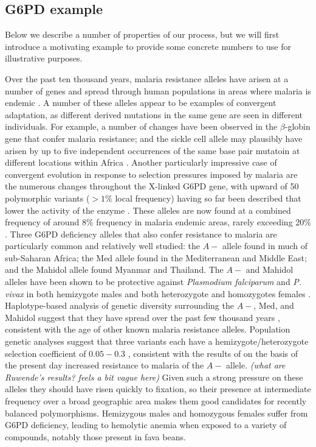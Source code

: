 \documentclass{article}
\newcommand{\plr}[1]{{\it\color{blue}(#1)}}
\begin{document}
\subsection{G6PD example}

Below we describe a number of properties of our process, but we will first introduce 
a motivating example to provide some concrete
numbers to use for illustrative purposes.

Over the past ten thousand years, malaria resistance alleles have arisen at a number of genes 
and spread through human populations in areas where malaria is endemic \citep{Kwiatkowski:05}. 
A number of these alleles appear to be examples of convergent adaptation, 
as different derived mutations in the same gene are seen in different individuals.
For example, 
a number of changes have been observed in the $\beta$-globin gene that confer malaria resistance;
and the sickle cell allele may plausibly have arisen by up to five independent occurrences
of the same base pair mutatoin at different locations within Africa
\citep{Flint:98,ralph2010parallel}.
Another particularly impressive case of convergent evolution in response to
selection pressures imposed by malaria are the numerous changes throughout the X-linked G6PD gene, 
with upward of 50 polymorphic variants ($>1\%$ local frequency) having so far been described 
that lower the activity of the enzyme \citep{Howes-g6pd-variants,Minucci-g6pd}. 
These alleles are now found at a combined frequency of around 8\% frequency in malaria endemic areas,
rarely exceeding 20\% \citep{Howes-g6pd-preval}. 
Three G6PD deficiency alleles that also confer resistance to malaria 
are particularly common and relatively well studied: 
the $A-$ allele found in much of sub-Saharan Africa; 
the Med allele found in the Mediterranean and Middle East; 
and the Mahidol allele found Myanmar and Thailand.
The $A-$ and Mahidol alleles have been shown
to be protective against {\it Plasmodium falciparum} and {\it P. vivax} in both
hemizygote males and both heterozygote and homozygotes females \citep{Ruwende-g6pd, Louicharoen-g6pd}. 
Haplotype-based analysis of genetic diversity surrounding
the $A-$, Med, and Mahidol suggest that they have spread over the past 
few thousand years \citet{tishkoff-g6pd,Slatkin-age-est,Saunders-g6pd,Louicharoen-g6pd}, 
consistent with the age of other known malaria resistance alleles. 
Population genetic analyses suggest that three variants each have a hemizygote/heterozygote 
selection coefficient of $0.05-0.3$ \citep{tishkoff-g6pd,Slatkin-age-est,Saunders-g6pd,Louicharoen-g6pd}, 
consistent with the results of \citet{Ruwende-g6pd} on the basis of the present day increased resistance to malaria of the $A-$ allele. 
\plr{what are Ruwende's results? feels a bit vague here}
Given such a strong pressure on these alleles they should have risen quickly to fixation, 
so their presence at intermediate frequency over a broad geographic area
makes them good candidates for recently balanced polymorphisms. 
Hemizygous males and homozygous females suffer from G6PD deficiency,
leading to hemolytic anemia when exposed to a variety of compounds, 
notably those present in fava beans. 
\end{document}
